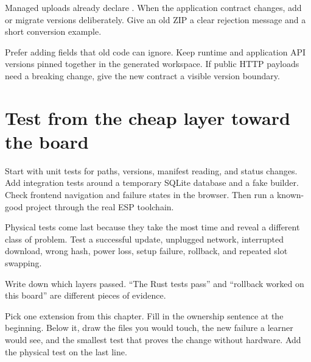 Managed uploads already declare . When the application contract changes, add or migrate versions deliberately. Give an old ZIP a clear rejection message and a short conversion example.

Prefer adding fields that old code can ignore. Keep runtime and application API versions pinned together in the generated workspace. If public HTTP payloads need a breaking change, give the new contract a visible version boundary.

\section{Test from the cheap layer toward the board}

Start with unit tests for paths, versions, manifest reading, and status changes. Add integration tests around a temporary SQLite database and a fake builder. Check frontend navigation and failure states in the browser. Then run a known-good project through the real ESP toolchain.

Physical tests come last because they take the most time and reveal a different class of problem. Test a successful update, unplugged network, interrupted download, wrong hash, power loss, setup failure, rollback, and repeated slot swapping.

Write down which layers passed. ``The Rust tests pass'' and ``rollback worked on this board'' are different pieces of evidence.

\begin{checkpoint}
Pick one extension from this chapter. Fill in the ownership sentence at the beginning. Below it, draw the files you would touch, the new failure a learner would see, and the smallest test that proves the change without hardware. Add the physical test on the last line.
\end{checkpoint}

